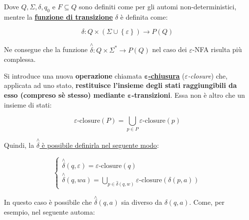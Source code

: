 \documentclass[a4paper]{article}
\begin{document}
	\noindent
	Dove $Q, \Sigma, \delta, q_{0} \text{ e } F \subseteq Q$ sono definiti come per gli automi non-deterministici, mentre la \textbf{\underline{funzione di transizione}} $\delta$ è definita come:
	
	\begin{equation*}
		\delta: Q \times \left(\Sigma \cup \left\{\varepsilon\right\}\right) \longrightarrow P\left(Q\right)
	\end{equation*}

	\noindent
	Ne consegue che la funzione $\overset{\wedge}{\delta}: Q \times \Sigma^{*} \longrightarrow P\left(Q\right)$ nel caso dei $\varepsilon$-NFA risulta più complessa.\newline
	
	\noindent
	Si introduce una nuova \textcolor{Red3}{\textbf{operazione}} chiamata \textcolor{Red3}{\underline{\textbf{$\boldsymbol{\varepsilon}$-chiusura}}} (\textcolor{Red3}{\emph{$\varepsilon$-closure}}) che, applicata ad uno stato, \textcolor{Red3}{\textbf{restituisce l'insieme degli stati raggiungibili da esso (compreso sè stesso) mediante $\boldsymbol{\varepsilon}$-transizioni}}.	Essa non è altro che un insieme di stati:
	
	\begin{equation*}
		\varepsilon\text{-closure}\left(P\right) = \bigcup_{p \in P} \varepsilon\text{-closure}\left(p\right)
	\end{equation*}

	\noindent
	Quindi, la \underline{$\overset{\wedge}{\delta}$ è possibile definirla nel seguente modo}:
	
	\begin{equation*}
		\begin{cases}
			\overset{\wedge}{\delta}\left(q, \varepsilon\right) = \varepsilon\text{-closure}\left(q\right) \\
			\overset{\wedge}{\delta}\left(q, wa\right) = \bigcup_{p \in \hat{\delta}\left(q, w\right)} \varepsilon\text{-closure}\left(\delta\left(p, a\right)\right)
		\end{cases}
	\end{equation*}

	\noindent
	In questo caso è possibile che $\overset{\wedge}{\delta}\left(q, a\right)$ sia diverso da $\delta\left(q, a\right)$. Come, per esempio, nel seguente automa:
	
\end{document}
